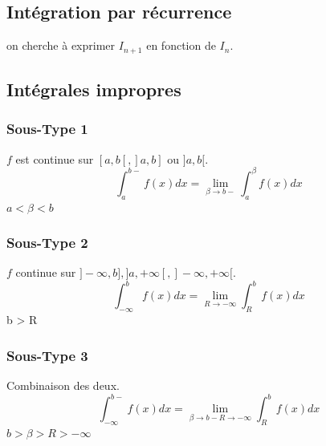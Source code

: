 \documentclass{article}
\begin{document}
\subsection{Intégration par récurrence}

on cherche à exprimer $ I_{n+1} $ en fonction de $ I_n $.

\subsection{Intégrales impropres}

\subsubsection{Sous-Type 1}

$ f $ est continue sur $ [a,b[, ]a, b]$ ou $ ]a, b[ $.
\[ \int_{a}^{b-}f(x)dx = \lim_{\beta \to {b-}} \int_{a}^{\beta}f(x)dx \]
$ a < \beta < b $

\subsubsection{Sous-Type 2}

$ f $ continue sur $ ]-\infty, b], ]a, +\infty[, ]-\infty, +\infty[ $.
\[ \int_{-\infty}^{b}f(x)dx = \lim_{R \to {-\infty}} \int_{R}^{b}f(x)dx \]
b > R

\subsubsection{Sous-Type 3}

Combinaison des deux.
\[ \int_{-\infty}^{b-}f(x)dx = \lim_{{\beta \to {b-}}{R \to {-\infty}}} \int_{R}^{b}f(x)dx \]
$b > \beta > R > -\infty$ 
\end{document}
